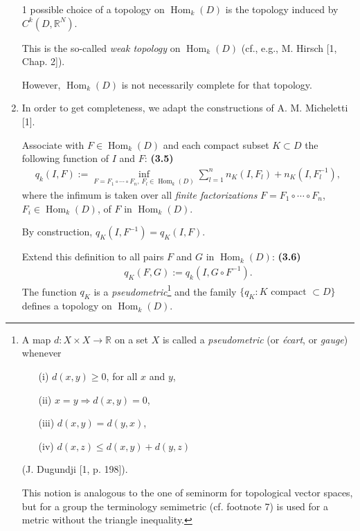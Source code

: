 \documentclass{book}
\numberwithin{equation}{section}
\begin{document}
\begin{enumerate}
    1 possible choice of a topology on $\operatorname{Hom}_k(D)$ is the topology induced by $C^k(D,\mathbb{R}^N)$.
    
    This is the so-called \textit{weak topology} on $\operatorname{Hom}_k(D)$ (cf., e.g., M. Hirsch [1, Chap. 2]).
    
    However, $\operatorname{Hom}_k(D)$ is not necessarily complete for that topology.
    \item In order to get completeness, we adapt the constructions of A. M. Micheletti [1].
    
    Associate with $F\in\operatorname{Hom}_k(D)$ and each compact subset $K\subset D$ the following function of $I$ and $F$: \textbf{(3.5)}
    \begin{align*}
        q_k(I,F) := \inf_{F = F_1\circ\cdots\circ F_n,\,F_l\in\operatorname{Hom}_k(D)} \sum_{l=1}^n n_K(I,F_l) + n_K\left(I,F_l^{-1}\right),
    \end{align*} 
    where the infimum is taken over all \textit{finite factorizations} $F = F_1\circ\cdots\circ F_n$, $F_i\in\operatorname{Hom}_k(D)$, of $F$ in $\operatorname{Hom}_k(D)$.
    
    By construction, $q_K(I,F^{-1}) = q_K(I,F)$.
    
    Extend this definition to all pairs $F$ and $G$ in $\operatorname{Hom}_k(D)$: \textbf{(3.6)}
    \begin{align*}
        q_K(F,G) := q_k\left(I,G\circ F^{-1}\right).
    \end{align*}
    The function $q_K$ is a \textit{pseudometric}\footnote{A map $d:X\times X\to\mathbb{R}$ on a set $X$ is called a \textit{pseudometric} (or \textit{écart}, or \textit{gauge}) whenever
        \begin{itemize}
            \item[(i)] $d(x,y)\ge 0$, for all $x$ and $y$,
            \item[(ii)] $x = y\Rightarrow d(x,y) = 0$,
            \item[(iii)] $d(x,y) = d(y,x)$,
            \item[(iv)] $d(x,z)\le d(x,y) + d(y,z)$
        \end{itemize}
        (J. Dugundji [1, p. 198]).
        
        This notion is analogous to the one of seminorm for topological vector spaces, but for a group the terminology semimetric (cf. footnote 7) is used for a metric without the triangle inequality.} and the family $\{q_K:K \mbox{ compact } \subset D\}$ defines a topology on $\operatorname{Hom}_k(D)$.
    

\end{enumerate}
\end{document}
